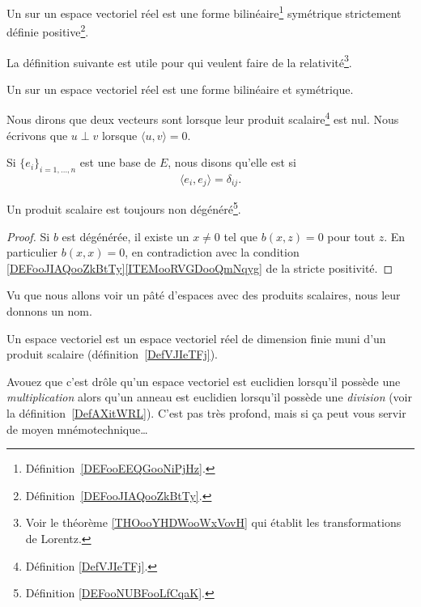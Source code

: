 \begin{definition}\label{DefVJIeTFj}
	Un  sur un espace vectoriel réel est une forme bilinéaire\footnote{Définition~\ref{DEFooEEQGooNiPjHz}.} symétrique strictement définie positive\footnote{Définition~\ref{DEFooJIAQooZkBtTy}.}.
\end{definition}

La définition suivante est utile pour  qui veulent faire de la relativité\footnote{Voir le théorème \ref{THOooYHDWooWxVovH} qui établit les transformations de Lorentz.}.
\begin{definition}      \label{DEFooLPBGooXLxubc}
	Un  sur un espace vectoriel réel est une forme bilinéaire et symétrique.
\end{definition}

\begin{definition}      \label{DEFooZBWTooIqXwRp}
	Nous dirons que deux vecteurs sont  lorsque leur produit scalaire\footnote{Définition \ref{DefVJIeTFj}.} est nul. Nous écrivons que \( u\perp v\) lorsque \( \langle u, v\rangle =0\).

	Si \( \{ e_i \}_{i=1,\ldots, n}\) est une base de \( E\), nous disons qu'elle est  si
	\begin{equation}
		\langle e_i, e_j\rangle =\delta_{ij}.
	\end{equation}
\end{definition}

\begin{lemma}       \label{LEMooLPUFooVCvnwW}
	Un produit scalaire est toujours non dégénéré\footnote{Définition \ref{DEFooNUBFooLfCqaK}.}.
\end{lemma}

\begin{proof}
	Si \(  b\) est dégénérée, il existe un \( x\neq 0\) tel que \( b(x,z)=0\) pour tout \( z\). En particulier \( b(x,x)=0\), en contradiction avec la condition \ref{DEFooJIAQooZkBtTy}\ref{ITEMooRVGDooQmNqyg} de la stricte positivité.
\end{proof}


Vu que nous allons voir un pâté d'espaces avec des produits scalaires, nous leur donnons un nom.
\begin{definition}			\label{DefLZMcvfj}
	Un espace vectoriel  est un espace vectoriel réel de dimension finie muni d'un produit scalaire (définition~\ref{DefVJIeTFj}).
\end{definition}
Avouez que c'est drôle qu'un espace vectoriel est euclidien lorsqu'il possède une \emph{multiplication} alors qu'un anneau est euclidien lorsqu'il possède une \emph{division} (voir la définition~\ref{DefAXitWRL}). C'est pas très profond, mais si ça peut vous servir de moyen mnémotechnique\ldots

